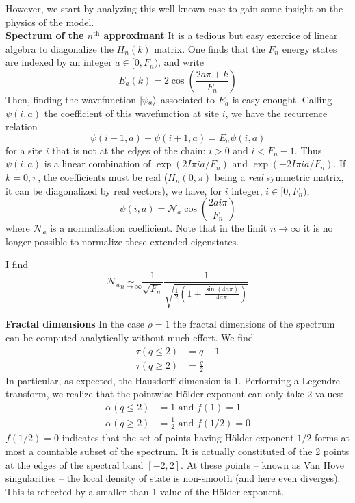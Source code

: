 \documentclass[11pt]{article}
\newcommand{\simlim}[2]{\ensuremath{ \underset{#1 \rightarrow #2}{\sim} }}
\newcommand{\nth}{$n^\text{th}$}
\begin{document}
However, we start by analyzing this well known case to gain some insight on the physics of the model.
\\

\textbf{Spectrum of the \nth{} approximant}
It is a tedious but easy exercice of linear algebra to diagonalize the $H_n(k)$ matrix.
One finds that the $F_n$ energy states are indexed by an integer $a \in [0, F_n)$, and write
\begin{equation}
	E_a(k) = 2 \cos \left( \frac{2 a \pi + k}{F_n} \right)
\end{equation}
Then, finding the wavefunction $\ket{\psi_a}$ associated to $E_a$ is easy enought. Calling $\psi(i,a)$ the coefficient of this wavefunction at site $i$, we have the recurrence relation
\begin{equation}
	\psi(i-1,a) + \psi(i+1,a) = E_a \psi(i,a)
\end{equation}
for a site $i$ that is not at the edges of the chain: $i > 0$ and $i < F_n -1$.
Thus $\psi(i,a)$ is a linear combination of $\exp( 2 I \pi i a/F_n )$ and $\exp( -2 I \pi i a/F_n )$. 
If $k = 0, \pi$, the coefficients must be real ($H_n(0,\pi)$ being a \emph{real} symmetric matrix, it can be diagonalized by real vectors), we have, for $i$ integer, $i \in [0, F_n)$,
\begin{equation}
	\psi(i,a) = \mathcal{N}_a \cos \left( \frac{2 a i \pi}{F_n} \right)
\end{equation}
where $\mathcal{N}_a$ is a normalization coefficient. Note that in the limit $n \rightarrow \infty$ it is no longer possible to normalize these extended eigenstates.

I find
\begin{equation}
	\mathcal{N}_a \simlim{n}{\infty} \frac{1}{\sqrt{F_n}} \frac{1}{\sqrt{\frac{1}{2}\left( 1 + \frac{\sin(4 a \pi)}{4 a \pi} \right)}}
\end{equation}

\textbf{Fractal dimensions}
In the case $\rho = 1$ the fractal dimensions of the spectrum can be computed analytically without much effort. 
We find
\begin{align}
	\tau(q \leq 2) &= q-1 \\
	\tau(q \geq 2) &= \frac{q}{2}
\end{align}
In particular, as expected, the Hausdorff dimension is 1. Performing a Legendre transform, we realize that the pointwise Hölder exponent can only take 2 values:
\begin{align}
	\alpha(q \leq 2) &= 1 \text{~and~} f(1) = 1\\
	\alpha(q \geq 2) &= \frac{1}{2} \text{~and~} f(1/2) = 0
\end{align}
$f(1/2) = 0$ indicates that the set of points having Hölder exponent $1/2$ forms at most a countable subset of the spectrum.
It is actually constituted of the 2 points at the edges of the spectral band $[-2,2]$. At these points -- known as Van Hove singularities -- the local density of state is non-smooth (and here even diverges). This is reflected by a smaller than 1 value of the Hölder exponent.
\end{document}
